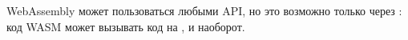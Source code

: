 
\noindent
{}

\medskip\noindent
WebAssembly может пользоваться любыми API, но это возможно только через \js: код
WASM может вызывать код на \js, и наоборот.
